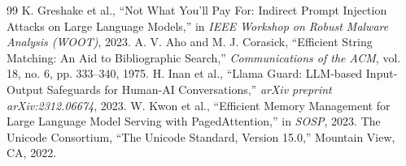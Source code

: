 \documentclass[11pt,a4paper]{article}
\begin{document}
\begin{thebibliography}{99}
 K. Greshake et al., ``Not What You'll Pay For: Indirect Prompt Injection Attacks on Large Language Models,'' in \emph{IEEE Workshop on Robust Malware Analysis (WOOT)}, 2023.
 A. V. Aho and M. J. Corasick, ``Efficient String Matching: An Aid to Bibliographic Search,'' \emph{Communications of the ACM}, vol. 18, no. 6, pp. 333--340, 1975.
 H. Inan et al., ``Llama Guard: LLM-based Input-Output Safeguards for Human-AI Conversations,'' \emph{arXiv preprint arXiv:2312.06674}, 2023.
 W. Kwon et al., ``Efficient Memory Management for Large Language Model Serving with PagedAttention,'' in \emph{SOSP}, 2023.
 The Unicode Consortium, ``The Unicode Standard, Version 15.0,'' Mountain View, CA, 2022.
\end{thebibliography}
\end{document}
